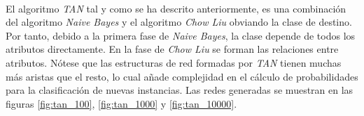 \documentclass{article}
\begin{document}
			\paragraph{}
			El algoritmo \emph{TAN} tal y como se ha descrito anteriormente, es una combinación del algoritmo \emph{Naive Bayes} y el algoritmo \emph{Chow Liu} obviando la clase de destino. Por tanto, debido a la primera fase de \emph{Naive Bayes}, la clase depende de todos los atributos directamente. En la fase de \emph{Chow Liu} se forman las relaciones entre atributos. Nótese que las estructuras de red formadas por \emph{TAN} tienen muchas más aristas que el resto, lo cual añade complejidad en el cálculo de probabilidades para la clasificación de nuevas instancias. Las redes generadas se muestran en las figuras  \ref{fig:tan_100}, \ref{fig:tan_1000} y \ref{fig:tan_10000}.
\end{document}

